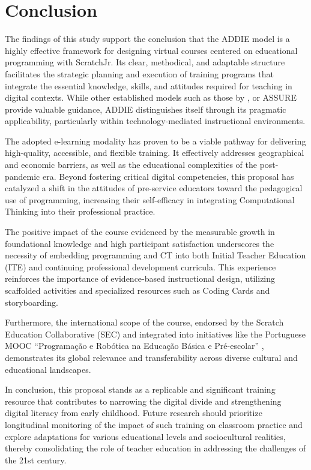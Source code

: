 \documentclass[english]{textolivre}
\begin{document}
\section{Conclusion}
The findings of this study support the conclusion that the ADDIE model is a highly effective framework for designing virtual courses centered on educational programming with ScratchJr. Its clear, methodical, and adaptable structure facilitates the strategic planning and execution of training programs that integrate the essential knowledge, skills, and attitudes required for teaching in digital contexts. While other established models such as those by \textcite{dick2009systematic,gagne2005principles}, or ASSURE \cite{heinich2002instructional} provide valuable guidance, ADDIE distinguishes itself through its pragmatic applicability, particularly within technology-mediated instructional environments.

The adopted e-learning modality has proven to be a viable pathway for delivering high-quality, accessible, and flexible training. It effectively addresses geographical and economic barriers, as well as the educational complexities of the post-pandemic era. Beyond fostering critical digital competencies, this proposal has catalyzed a shift in the attitudes of pre-service educators toward the pedagogical use of programming, increasing their self-efficacy in integrating Computational Thinking into their professional practice.

The positive impact of the course evidenced by the measurable growth in foundational knowledge and high participant satisfaction underscores the necessity of embedding programming and CT into both Initial Teacher Education (ITE) and continuing professional development curricula. This experience reinforces the importance of evidence-based instructional design, utilizing scaffolded activities and specialized resources such as Coding Cards and storyboarding.

Furthermore, the international scope of the course, endorsed by the Scratch Education Collaborative (SEC) and integrated into initiatives like the Portuguese MOOC “Programação e Robótica na Educação Básica e Pré-escolar” \cite{amante2023designing}, demonstrates its global relevance and transferability across diverse cultural and educational landscapes.

In conclusion, this proposal stands as a replicable and significant training resource that contributes to narrowing the digital divide and strengthening digital literacy from early childhood. Future research should prioritize longitudinal monitoring of the impact of such training on classroom practice and explore adaptations for various educational levels and sociocultural realities, thereby consolidating the role of teacher education in addressing the challenges of the 21st century.
\end{document}
